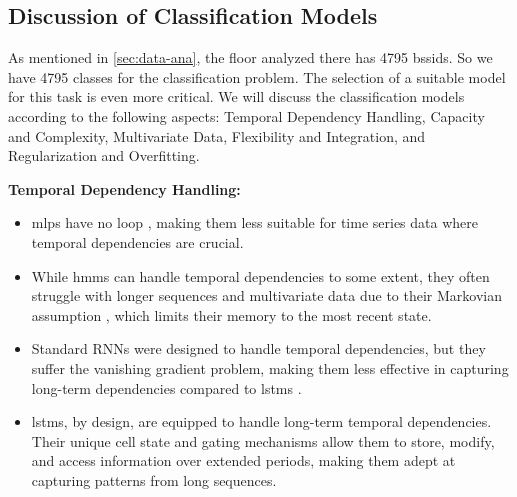 \subsection{Discussion of Classification Models}
As mentioned in \cref{sec:data-ana}, the floor analyzed there has 4795 \acp{bssid}.
So we have 4795 classes for the classification problem.
The selection of a suitable model for this task is even more critical.
We will discuss the classification models according to  the following aspects: Temporal Dependency Handling, Capacity and Complexity, Multivariate Data, Flexibility and Integration, and Regularization and Overfitting.


\textbf{Temporal Dependency Handling:}
\begin{itemize}
    \item \acp{mlp} have no loop \cite{mlp_and_nn}, making them less suitable for time series data where temporal dependencies are crucial.
    \item While \acp{hmm} can handle temporal dependencies to some extent, they often struggle with longer sequences and multivariate data due to their Markovian assumption \cite{hmm-rabiner-1989}, which limits their memory to the most recent state.
    \item Standard RNNs were designed to handle temporal dependencies, but they suffer the vanishing gradient problem, making them less effective in capturing long-term dependencies compared to \acp{lstm} \cite{rnn_difficulties_2013}.
    \item \acp{lstm}, by design, are equipped to handle long-term temporal dependencies. Their unique cell state and gating mechanisms allow them to store, modify, and access information over extended periods, making them adept at capturing patterns from long sequences. \cite{lstm-hochreiter}
\end{itemize}


